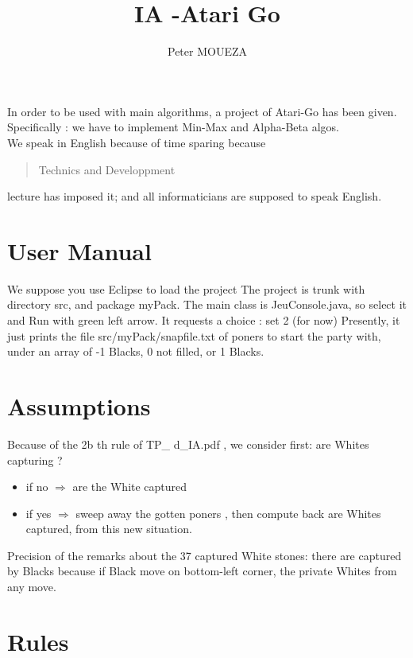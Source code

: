 \documentclass{book}
\newcommand{\tmtextbf}[1]{{\bfseries{#1}}}
\begin{document}
\title{IA -Atari Go}
\author{Peter MOUEZA}
\maketitle


In order to be used with main algorithms, a project of Atari-Go has been given.
Specifically : we have to implement Min-Max  and Alpha-Beta algos.\\
We speak in English because of time sparing because \begin{quotation}
Technics and Developpment
\end{quotation} lecture has imposed it; and all informaticians are supposed to speak English.


\chapter{User Manual}

We suppose you use Eclipse to load the project 
The project is trunk with directory src, and package myPack.
The main class is JeuConsole.java, so select it and Run with green left arrow.
It requests a choice : set 2 (for now)
Presently, it just prints the file src/myPack/snapfile.txt of poners to start the party with, under an array of -1 Blacks, 0 not filled, or 1 Blacks.
\chapter{Assumptions}
Because of the 2b th rule of 
TP\_
d\_IA.pdf , we consider first: are Whites capturing 
?\\
\begin{itemize}
\item if no 
$
\Rightarrow
$
are the White captured
\item if yes 
$
\Rightarrow
$
sweep away the gotten poners , then compute back are Whites captured, from this new situation.
\end{itemize}

Precision of the remarks about the 37 captured White stones: there are captured by Blacks because if Black move on bottom-left corner, the private Whites from any move.
\chapter{Rules}
\end{document}
